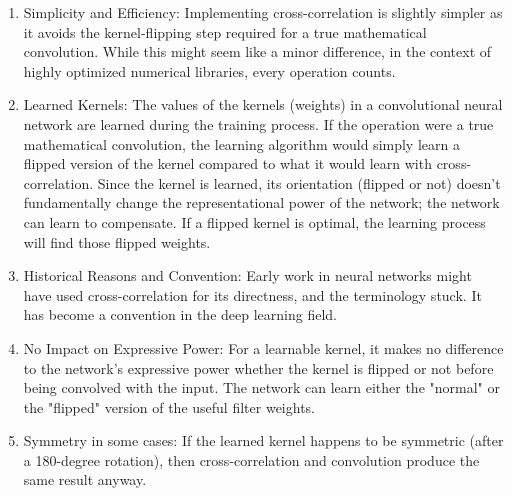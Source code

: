 \begin{enumerate}
    \item Simplicity and Efficiency: Implementing cross-correlation is slightly simpler as it avoids the kernel-flipping step required for a true mathematical convolution. While this might seem like a minor difference, in the context of highly optimized numerical libraries, every operation counts.

    \item Learned Kernels: The values of the kernels (weights) in a convolutional neural network are learned during the training process. If the operation were a true mathematical convolution, the learning algorithm would simply learn a flipped version of the kernel compared to what it would learn with cross-correlation. Since the kernel is learned, its orientation (flipped or not) doesn't fundamentally change the representational power of the network; the network can learn to compensate. If a flipped kernel is optimal, the learning process will find those flipped weights.
    
    \item Historical Reasons and Convention: Early work in neural networks might have used cross-correlation for its directness, and the terminology stuck. It has become a convention in the deep learning field.
    
    \item No Impact on Expressive Power: For a learnable kernel, it makes no difference to the network's expressive power whether the kernel is flipped or not before being convolved with the input. The network can learn either the "normal" or the "flipped" version of the useful filter weights.
    
    \item Symmetry in some cases: If the learned kernel happens to be symmetric (after a 180-degree rotation), then cross-correlation and convolution produce the same result anyway.
    
\end{enumerate}

\newpage
